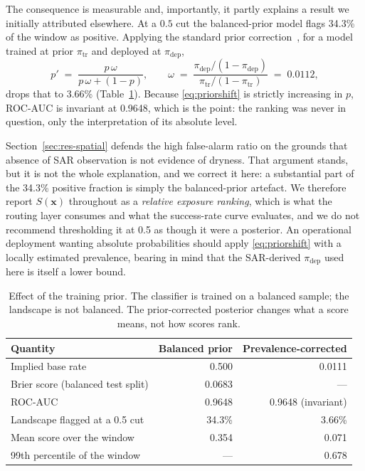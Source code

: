 \documentclass[11pt,a4paper]{article}
\newcommand{\Sx}{S(\mathbf{x})}
\begin{document}
The consequence is measurable and, importantly, it partly explains a result we
initially attributed elsewhere. At a $0.5$ cut the balanced-prior model flags
34.3\% of the window as positive. Applying the standard prior
correction~\citep{elkan2001,saerens2002}, for a model trained at prior
$\pi_{\mathrm{tr}}$ and deployed at $\pi_{\mathrm{dep}}$,
\begin{equation}
p' \;=\; \frac{p\,\omega}{p\,\omega + (1-p)},
\qquad
\omega \;=\; \frac{\pi_{\mathrm{dep}}/(1-\pi_{\mathrm{dep}})}
                  {\pi_{\mathrm{tr}}/(1-\pi_{\mathrm{tr}})} \;=\; 0.0112,
\label{eq:priorshift}
\end{equation}
drops that to 3.66\% (Table~\ref{tab:prior}). Because \eqref{eq:priorshift} is
strictly increasing in $p$, ROC-AUC is invariant at 0.9648, which is the point:
the ranking was never in question, only the interpretation of its absolute level.

Section~\ref{sec:res-spatial} defends the high false-alarm ratio on the grounds
that absence of SAR observation is not evidence of dryness. That argument stands,
but it is not the whole explanation, and we correct it here: a substantial part
of the 34.3\% positive fraction is simply the balanced-prior artefact. We
therefore report $\Sx$ throughout as a \emph{relative exposure ranking}, which is
what the routing layer consumes and what the success-rate curve evaluates, and we
do not recommend thresholding it at 0.5 as though it were a posterior. An
operational deployment wanting absolute probabilities should apply
\eqref{eq:priorshift} with a locally estimated prevalence, bearing in mind that
the SAR-derived $\pi_{\mathrm{dep}}$ used here is itself a lower bound.

\begin{table}[t]
\centering
\caption{Effect of the training prior. The classifier is trained on a balanced
sample; the landscape is not balanced. The prior-corrected posterior changes what
a score means, not how scores rank.}
\label{tab:prior}
\small
\begin{tabular}{@{}lrr@{}}
\toprule
\textbf{Quantity} & \textbf{Balanced prior} & \textbf{Prevalence-corrected} \\
\midrule
Implied base rate & 0.500 & 0.0111 \\
Brier score (balanced test split) & 0.0683 & --- \\
ROC-AUC & 0.9648 & 0.9648 (invariant) \\
Landscape flagged at a 0.5 cut & 34.3\% & 3.66\% \\
Mean score over the window & 0.354 & 0.071 \\
99th percentile of the window & --- & 0.678 \\
\bottomrule
\end{tabular}
\end{table}
\end{document}
